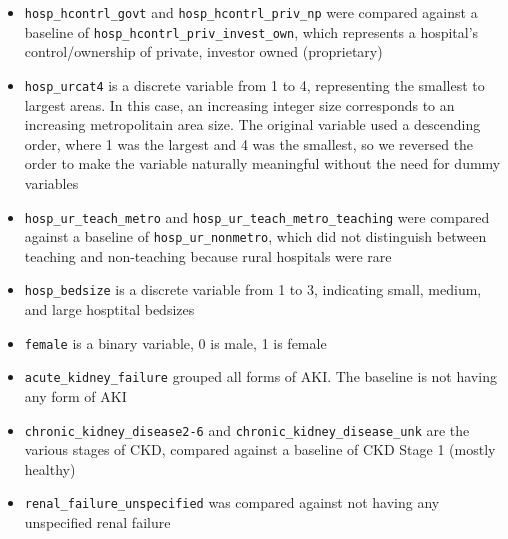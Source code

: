\documentclass[12pt]{ociamthesis}\usepackage[]{graphicx}\usepackage[]{color}
\begin{document}
\begin{itemize}
  \item \texttt{hosp\_hcontrl\_govt} and \texttt{hosp\_hcontrl\_priv\_np} were compared against a baseline of 
        \texttt{hosp\_hcontrl\_priv\_invest\_own}, which represents a hospital's control/ownership of private, investor owned (proprietary)
  \item \texttt{hosp\_urcat4} is a discrete variable from 1 to 4, representing the smallest to largest areas. In this case, an increasing integer
        size corresponds to an increasing metropolitain area size. The original variable used a descending order, where 1 was the largest and 4 was the
        smallest, so we reversed the order to make the variable naturally meaningful without the need for dummy variables
  \item \texttt{hosp\_ur\_teach\_metro} and \texttt{hosp\_ur\_teach\_metro\_teaching} were compared against a baseline of \texttt{hosp\_ur\_nonmetro}, 
        which did not distinguish between teaching and non-teaching because rural hospitals  were rare 
  \item \texttt{hosp\_bedsize} is a discrete variable from 1 to 3, indicating small, medium, and large hosptital bedsizes
  \item \texttt{female} is a binary variable, 0 is male, 1 is female
  \item \texttt{acute\_kidney\_failure} grouped all forms of AKI. The baseline is not having any form of AKI
  \item \texttt{chronic\_kidney\_disease2-6} and \texttt{chronic\_kidney\_disease\_unk} are the various stages of CKD, compared against a baseline of CKD Stage 1 (mostly healthy)
  \item \texttt{renal\_failure\_unspecified} was compared against not having any unspecified renal failure
\end{itemize}
\end{document}
